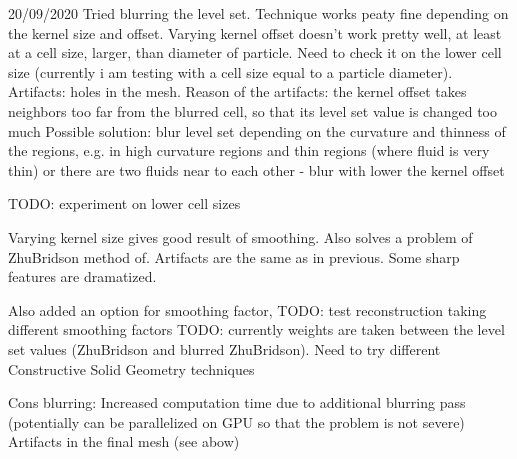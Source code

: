 20/09/2020
Tried blurring the level set. Technique works peaty fine depending on the kernel size and offset.
Varying kernel offset doesn't work pretty well, at least at a cell size, larger, than diameter of particle. 
Need to check it on the lower cell size (currently i am testing with a cell size equal to a particle diameter).
Artifacts: holes in the mesh.
Reason of the artifacts: the kernel offset takes neighbors too far from the blurred cell, so that its level set value is changed too much
Possible solution: blur level set depending on the curvature and thinness of the regions, e.g. in 
	high curvature regions and thin regions (where fluid is very thin) or there are two fluids near to each other - blur with lower the kernel offset

TODO: experiment on lower cell sizes

Varying kernel size gives good result of smoothing. Also solves a problem of ZhuBridson method of. Artifacts are the same as in previous. 
Some sharp features are dramatized.

Also added an option for smoothing factor, 
TODO: test reconstruction taking different smoothing factors
TODO: currently weights are taken between the level set values (ZhuBridson and blurred ZhuBridson). Need to try different Constructive Solid Geometry techniques

Cons blurring: Increased computation time due to additional blurring pass (potentially can be parallelized on GPU so that the problem is not severe)
				Artifacts in the final mesh (see abow)